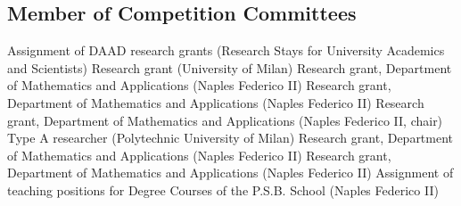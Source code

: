 \documentclass[11pt,a4paper,sans,colorlinks,linkcolor=green]{moderncv}
\begin{document}
\subsection*{Member of Competition Committees}
 {Assignment of DAAD research grants (Research Stays for University Academics and Scientists)}
 {Research grant (University of Milan)}
 {Research grant, Department of Mathematics and Applications (Naples Federico II)}
 {Research grant, Department of Mathematics and Applications (Naples Federico II)}
 {Research grant, Department of Mathematics and Applications (Naples Federico II, chair)}
 {Type A researcher (Polytechnic University of Milan)}
 {Research grant, Department of Mathematics and Applications (Naples Federico II)}
 {Research grant, Department of Mathematics and Applications (Naples Federico II)}
 {Assignment of teaching positions for Degree Courses of the P.S.B. School (Naples Federico II)}

\end{document}
